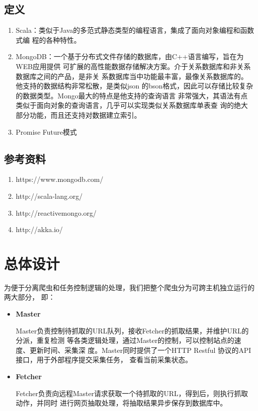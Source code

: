 \subsection{定义}

\begin{enumerate}
\item Scala：类似于Java的多范式静态类型的编程语言，集成了面向对象编程和函数式编
  程的各种特性。

\item MongoDB：一个基于分布式文件存储的数据库，由C++语言编写，旨在为WEB应用提供
  可扩展的高性能数据存储解决方案。介于关系数据库和非关系数据库之间的产品，是非关
  系数据库当中功能最丰富，最像关系数据库的。他支持的数据结构非常松散，是类似json
  的bson格式，因此可以存储比较复杂的数据类型。Mongo最大的特点是他支持的查询语言
  非常强大，其语法有点类似于面向对象的查询语言，几乎可以实现类似关系数据库单表查
  询的绝大部分功能，而且还支持对数据建立索引。

\item Promise Future模式

\end{enumerate}

\subsection{参考资料}

\begin{enumerate}
\item https://www.mongodb.com/
\item http://scala-lang.org/
\item http://reactivemongo.org/
\item http://akka.io/
\end{enumerate}


\section{ 总体设计 }

为便于分离爬虫和任务控制逻辑的处理，我们把整个爬虫分为可跨主机独立运行的两大部分，
即：

\begin{itemize}
\item \textbf{Master}

  Master负责控制待抓取的URL队列，接收Fetcher的抓取结果，并维护URL的分派，重复检测
  等各类逻辑处理，通过Master的控制，可以控制站点的速度、更新时间、采集深
  度。Master同时提供了一个HTTP Restful 协议的API接口，用于外部程序提交采集任务，
  查看当前采集状态。
  
\item \textbf{Fetcher}

  Fetcher负责向远程Master请求获取一个待抓取的URL，得到后，则执行抓取动作，并同时
  进行网页抽取处理，将抽取结果异步保存到数据库中。
\end{itemize}


